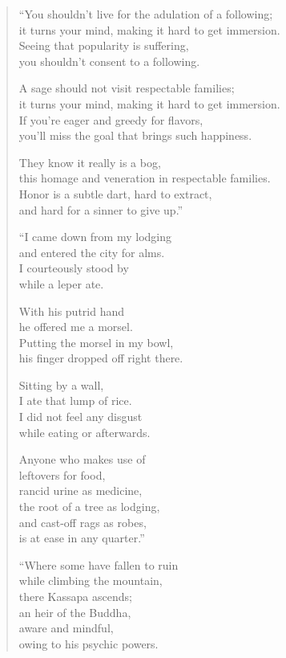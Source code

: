 \documentclass[12pt,openany]{book}%
\begin{document}
\begin{verse}%
“You shouldn’t live for the adulation of a following; \\
it turns your mind, making it hard to get immersion. \\
Seeing that popularity is suffering, \\
you shouldn’t consent to a following. 

A sage should not visit respectable families; \\
it turns your mind, making it hard to get immersion. \\
If you’re eager and greedy for flavors, \\
you’ll miss the goal that brings such happiness. 

They know it really is a bog, \\
this homage and veneration in respectable families. \\
Honor is a subtle dart, hard to extract, \\
and hard for a sinner to give up.” 

“I came down from my lodging \\
and entered the city for alms. \\
I courteously stood by \\
while a leper ate. 

With his putrid hand \\
he offered me a morsel. \\
Putting the morsel in my bowl, \\
his finger dropped off right there. 

Sitting by a wall, \\
I ate that lump of rice. \\
I did not feel any disgust \\
while eating or afterwards. 

Anyone who makes use of \\
leftovers for food, \\
rancid urine as medicine, \\
the root of a tree as lodging, \\
and cast-off rags as robes, \\
is at ease in any quarter.” 

“Where some have fallen to ruin \\
while climbing the mountain, \\
there Kassapa ascends; \\
an heir of the Buddha, \\
aware and mindful, \\
owing to his psychic powers. 


\end{verse}
\end{document}

